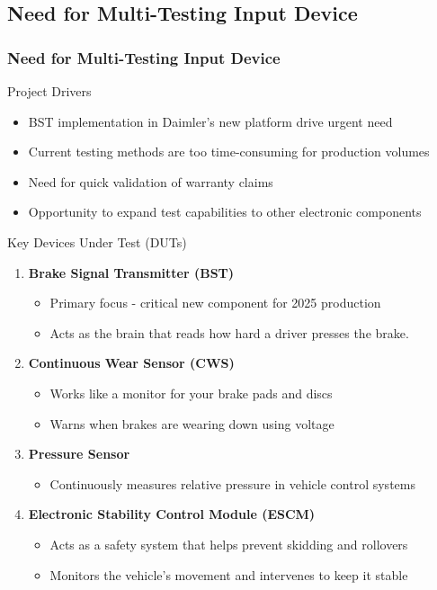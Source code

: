 \documentclass[8pt,compress]{beamer}
\newcommand\DarkBold[1]{\textcolor{VSBlueDark}{\textbf{#1}}}
\begin{document}
\subsection{Need for Multi-Testing Input Device}
\begin{frame}
    \frametitle{Need for Multi-Testing Input Device}
    \begin{block}{Project Drivers}
        \begin{itemize}
            \item BST implementation in Daimler's new platform drive urgent need
            \item Current testing methods are too time-consuming for production volumes
            \item Need for quick validation of warranty claims
            \item Opportunity to expand test capabilities to other electronic components
        \end{itemize}
    \end{block}
    \begin{block}{Key Devices Under Test (DUTs)}
    \begin{enumerate}
        \item {\DarkBold{Brake Signal Transmitter (BST)}}
        \begin{itemize}
            \item Primary focus - critical new component for 2025 production
            \item Acts as the brain that reads how hard a driver presses the brake.
        \end{itemize}
        \item {\DarkBold{Continuous Wear Sensor (CWS)}}
        \begin{itemize}
            \item Works like a monitor for your brake pads and discs
            \item Warns when brakes are wearing down using voltage
        \end{itemize}
        \item {\DarkBold{Pressure Sensor}}
        \begin{itemize}
            \item Continuously measures relative pressure in vehicle control systems
        \end{itemize}
        \item {\DarkBold{Electronic Stability Control Module (ESCM)}}
            \begin{itemize}
                \item Acts as a safety system that helps prevent skidding and rollovers
                \item Monitors the vehicle's movement and intervenes to keep it stable
            \end{itemize}
    \end{enumerate}
  \end{block}
\end{frame}
\end{document}
